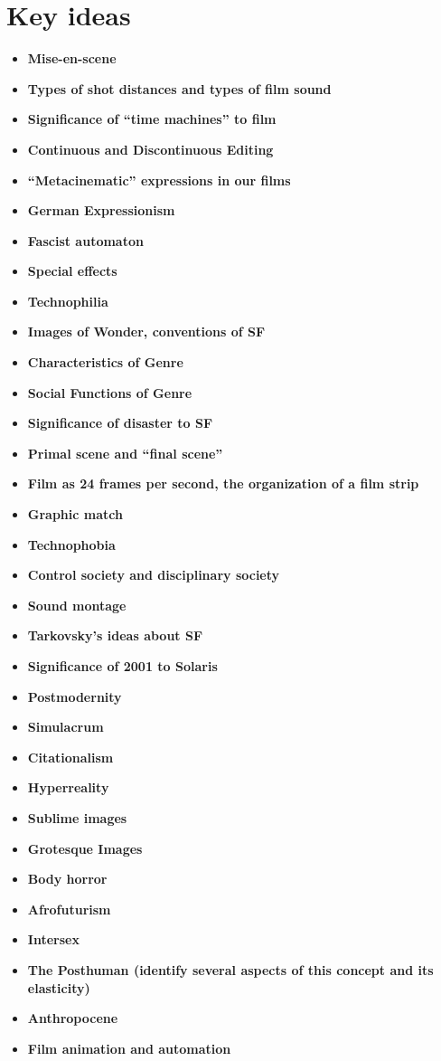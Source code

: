 \documentclass[11pt,fleqn]{book} %
\begin{document}
\section{Key ideas}
\begin{itemize}
\item \textbf{Mise-en-scene}
\item \textbf{Types of shot distances and types of film sound}
\item \textbf{Significance of “time machines” to film}
\item \textbf{Continuous and Discontinuous Editing}
\item \textbf{“Metacinematic” expressions in our films}
\item \textbf{German Expressionism}
\item \textbf{Fascist automaton}
\item \textbf{Special effects}
\item \textbf{Technophilia}
\item \textbf{Images of Wonder, conventions of SF}
\item \textbf{Characteristics of Genre}
\item \textbf{Social Functions of Genre}
\item \textbf{Significance of disaster to SF}
\item \textbf{Primal scene and “final scene”}
\item \textbf{Film as 24 frames per second, the organization of a film strip}
\item \textbf{Graphic match}
\item \textbf{Technophobia}
\item \textbf{Control society and disciplinary society}
\item \textbf{Sound montage} 
\item \textbf{Tarkovsky’s ideas about SF}
\item \textbf{Significance of 2001 to Solaris}
\item \textbf{Postmodernity}
\item \textbf{Simulacrum}
\item \textbf{Citationalism}
\item \textbf{Hyperreality}
\item \textbf{Sublime images}
\item \textbf{Grotesque Images}
\item \textbf{Body horror}
\item \textbf{Afrofuturism}
\item \textbf{Intersex}
\item \textbf{The Posthuman (identify several aspects of this concept and its elasticity)}
\item \textbf{Anthropocene}
\item \textbf{Film animation and automation}
\end{itemize}
\end{document}
